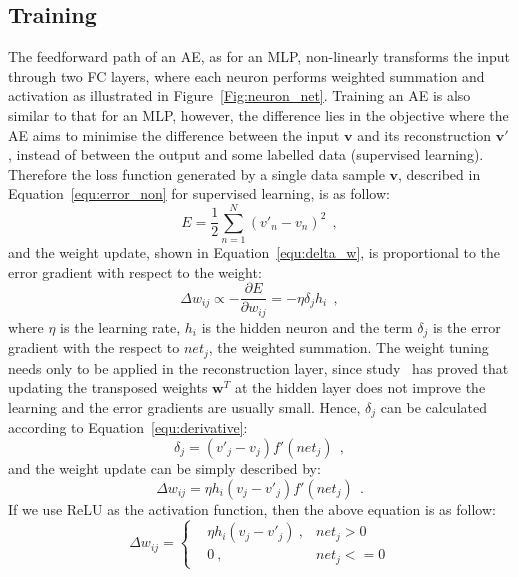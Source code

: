 \subsection{Training}
The feedforward path of an AE, as for an MLP, non-linearly transforms the input through two FC layers, where each neuron performs weighted summation and activation as illustrated in Figure~\ref{Fig:neuron_net}.
Training an AE is also similar to that for an MLP, however, the difference lies in the objective where the AE aims to minimise the difference between the input $\mathbf{v}$ and its reconstruction $\mathbf{v'}$, instead of between the output and some labelled data (supervised learning).
Therefore the loss function generated by a single data sample $\mathbf{v}$, described in Equation~\ref{equ:error_non} for supervised learning, is as follow:
\begin{equation}
E = \frac{1}{2}\sum_{n=1}^N (v'_{n}-v_{n})^{2}~~,
\end{equation}
and the weight update, shown in Equation~\ref{equ:delta_w}, is proportional to the error gradient with respect to the weight:
\begin{equation}
\Delta w_{ij} \propto -\frac{\partial E}{\partial w_{ij}} = -\eta \delta_j h_i~~,
\end{equation}
where $\eta$ is the learning rate, $h_i$ is the hidden neuron and the term $\delta_j$ is the error gradient with the respect to $net_j$, the weighted summation.
The weight tuning needs only to be applied in the reconstruction layer, since study~\citep{xu1993least} has proved that updating the transposed weights $\mathbf{w}^T$ at the hidden layer does not improve the learning and the error gradients are usually small.
Hence, $\delta_j$  can be calculated according to Equation~\ref{equ:derivative}:
\begin{equation}
\delta_j = (v'_{j}-v_{j}) f'(net_j)~~,
\end{equation}
and the weight update can be simply described by:
\begin{equation}
\Delta w_{ij} = \eta h_i (v_{j}-v'_{j})  f'(net_j)~~.
\end{equation}
If we use ReLU as the activation function, then the above equation is as follow:
\begin{equation}
\label{equ:ae_widrow_hoff}
\Delta w_{ij} = \left \{
\begin{aligned}
& \eta h_i(v_j - v'_j)~, & net_j > 0 \\
& 0~, & net_j < = 0
\end{aligned} 
\right.
\end{equation}

